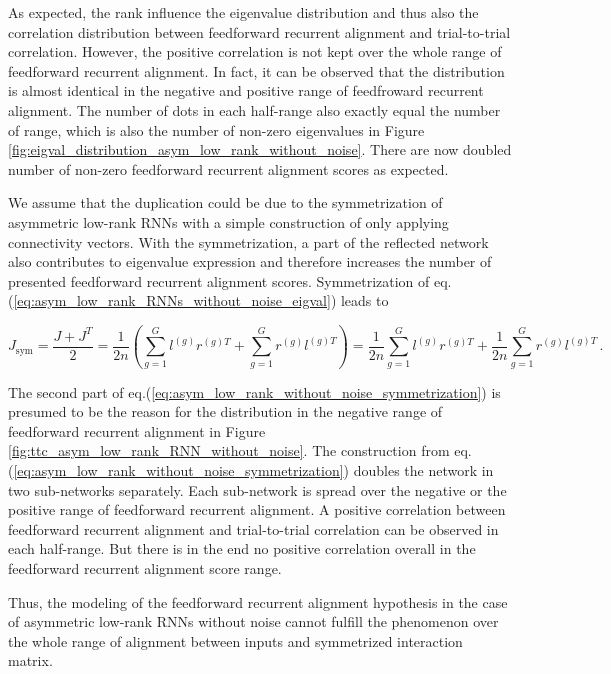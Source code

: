 \documentclass[11pt]{article}
\begin{document}
	As expected, the rank influence the eigenvalue distribution and thus also the correlation distribution between feedforward recurrent alignment and trial-to-trial correlation. However, the positive correlation is not kept over the whole range of feedforward recurrent alignment. In fact, it can be observed that the distribution is almost identical in the negative and positive range of feedfroward recurrent alignment. The number of dots in each half-range also exactly equal the number of range, which is also the number of non-zero eigenvalues in Figure \ref{fig:eigval_distribution_asym_low_rank_without_noise}. There are now doubled number of non-zero feedforward recurrent alignment scores as expected. 
		
	We assume that the duplication could be due to the symmetrization of asymmetric low-rank RNNs with a simple construction of only applying connectivity vectors. With the symmetrization, a part of the reflected network also contributes to eigenvalue expression and therefore increases the number of presented feedforward recurrent alignment scores. Symmetrization of eq.(\ref{eq:asym_low_rank_RNNs_without_noise_eigval}) leads to
	
		\begin{equation} \label{eq:asym_low_rank_without_noise_symmetrization}
			J_{\text{sym}} = \frac{J + J^T}{2} = \frac{1}{2n} \left( \sum_{g=1}^{G} l^{(g)} r^{(g)T} + \sum_{g=1}^{G} r^{(g)} l^{(g)T}\right) = \frac{1}{2n} \sum_{g=1}^{G} l^{(g)} r^{(g)T} + \frac{1}{2n} \sum_{g=1}^{G} r^{(g)} l^{(g)T} \, .
		\end{equation}
	
	
	The second part of eq.(\ref{eq:asym_low_rank_without_noise_symmetrization}) is presumed to be the reason for the distribution in the negative range of feedforward recurrent alignment in Figure \ref{fig:ttc_asym_low_rank_RNN_without_noise}. The construction from eq.(\ref{eq:asym_low_rank_without_noise_symmetrization}) doubles the network in two sub-networks separately. Each sub-network is spread over the negative or the positive range of feedforward recurrent alignment. A positive correlation between feedforward recurrent alignment and trial-to-trial correlation can be observed in each half-range. But there is in the end no positive correlation overall in the feedforward recurrent alignment score range. 
	
	Thus, the modeling of the feedforward recurrent alignment hypothesis in the case of asymmetric low-rank RNNs without noise cannot fulfill the phenomenon over the whole range of alignment between inputs and symmetrized interaction matrix. 
\end{document}
